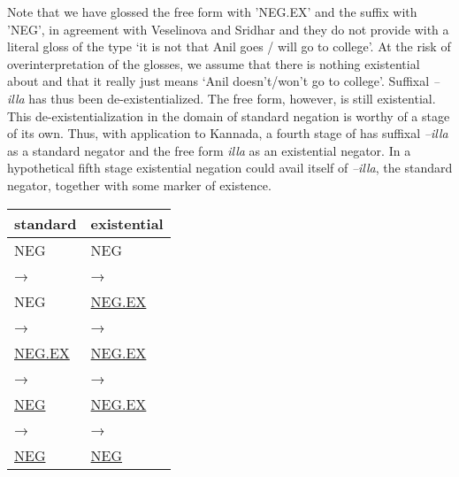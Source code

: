 ﻿\documentclass[output=paper]{langsci/langscibook}
\begin{document}
%
Note that we have glossed the free form with 'NEG.EX' and
the suffix with 'NEG', in agreement with Veselinova and
Sridhar and they do not  provide  with a literal gloss of
the type `it is not that Anil goes \slash{} will go to college'. At the risk of
overinterpretation of the glosses, we assume that there is nothing
existential about  and that it really just means `Anil
doesn't\slash{}won't go to college'. Suffixal \textit{–illa} has thus been
de-existentialized. The free form, however, is still existential. This
de-existentialization in the domain of standard negation is worthy of a
stage of its own. Thus, with application to Kannada, a fourth stage of
 has suffixal \textit{–illa} as a standard negator and the
free form \textit{illa} as an existential negator. In a hypothetical fifth
stage existential negation could avail itself of \textit{–illa}, the
standard negator, together with some marker of existence.
%
\begin{exe}\begin{small}\ex\label{ex:int-fourth-stage}\begin{tabularx}{.5\textwidth}[t]{Q Q}
          standard & existential\\\midrule
        NEG                 &NEG            \\
→ & → \\
        NEG             &\uline{NEG.EX}  \\
→ & → \\
        \uline{NEG.EX}   &\uline{NEG.EX}  \\
→ & → \\
        \uline{NEG}   &\uline{NEG.EX}  \\
→ & → \\
        \uline{NEG}   &\uline{NEG}
\end{tabularx}\end{small}\end{exe}
\end{document}
